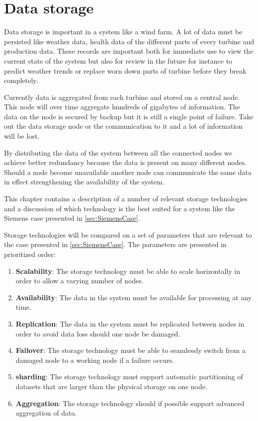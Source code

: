 \section{Data storage}
Data storage is important in a system like a wind farm.
A lot of data must be persisted like weather data, health data of the different parts of every turbine and production data.
These records are important both for immediate use to view the current state of the system but also for review in the future for instance to predict weather trends or replace worn down parts of turbine before they break completely.

Currently data is aggregated from each turbine and stored on a central node.
This node will over time aggregate hundreds of gigabytes of information.
The data on the node is secured by backup but it is still a single point of failure.
Take out the data storage node or the communication to it and a lot of information will be lost.

By distributing the data of the system between all the connected nodes we achieve better redundancy because the data is present on many different nodes.
Should a node become unavailable another node can communicate the same data in effect strengthening the availability of the system.

This chapter contains a description of a number of relevant storage technologies and a discussion of which technology is the best suited for a system like the Siemens case presented in \cref{sec:SiemensCase}.

Storage technologies will be compared on a set of parameters that are relevant to the case presented in \cref{sec:SiemensCase}. The parameters are presented in prioritized order:

\begin{enumerate}
\item \label{enum:parameters:availability} \textbf{Scalability}: The storage technology must be able to scale horizontally in order to allow a varying number of nodes.
\item \textbf{Availability}: The data in the system must be available for processing at any time.
\item \textbf{Replication}: The data in the system must be replicated between nodes in order to avoid data loss should one node be damaged.
\item \textbf{Failover}: The storage technology must be able to seamlessly switch from a damaged node to a working node if a failure occurs.
\item \textbf{sharding}: The storage technology must support automatic partitioning of datasets that are larger than the physical storage on one node.
\item \textbf{Aggregation}: The storage technology should if possible support advanced aggregation of data.
\end{enumerate}


